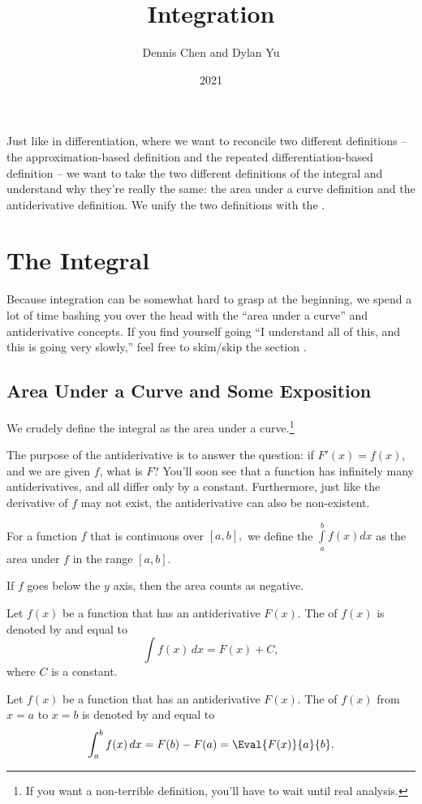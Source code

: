\documentclass[mast]{lucky}
\title{Integration}
\author{Dennis Chen and Dylan Yu}
\date{2021}
\begin{document}
\maketitle

Just like in differentiation, where we want to reconcile two different definitions -- the approximation-based definition and the repeated differentiation-based definition -- we want to take the two different definitions of the integral and understand why they're really the same: the area under a curve definition and the antiderivative definition. We unify the two definitions with the .

\section{The Integral}

Because integration can be somewhat hard to grasp at the beginning, we spend a lot of time bashing you over the head with the ``area under a curve'' and antiderivative concepts. If you find yourself going ``I understand all of this, and this is going very slowly,'' feel free to skim/skip the section .

\subsection{Area Under a Curve and Some Exposition}

We crudely define the integral as the area under a curve.\footnote{If you want a non-terrible definition, you'll have to wait until real analysis.}

The purpose of the antiderivative is to answer the question: if $F'(x)=f(x)$, and we are given $f$, what is $F$? You'll soon see that a function has infinitely many antiderivatives, and all differ only by a constant. Furthermore, just like the derivative of $f$ may not exist, the antiderivative can also be non-existent.

\begin{defi}[Integral]
For a function $f$ that is continuous over $[a,b],$ we define the  $\int\limits_{a}^{b}f(x)dx$ as the area under $f$ in the range $[a,b].$

If $f$ goes below the $y$ axis, then the area counts as negative.
\end{defi}

\begin{defi}
Let $f(x)$ be a function that has an antiderivative $F(x)$. The  of $f(x)$ is denoted by and equal to
$$\int f(x)\,dx = F(x)+C,$$
where $C$ is a constant.
\end{defi}
\begin{defi}
Let $f(x)$ be a function that has an antiderivative $F(x)$. The  of $f(x)$ from $x=a$ to $x=b$ is denoted by and equal to
$$\int_a^b f(x)\, dx=F(b)-F(a)=\Eval{F(x)}{a}{b}.$$
\end{defi}
\end{document}
